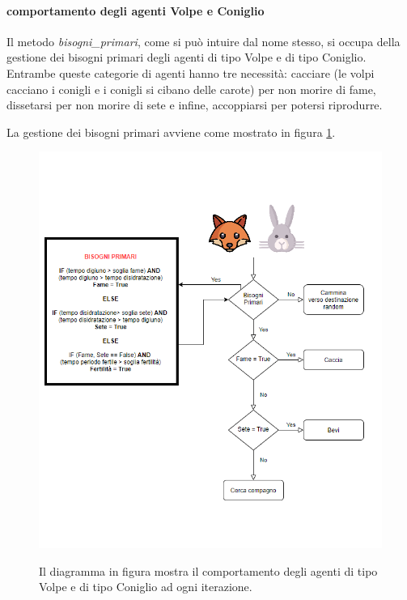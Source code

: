 \documentclass[11pt]{article}
\begin{document}
\paragraph{comportamento degli agenti Volpe e Coniglio}

Il metodo \emph{bisogni\_primari}, come si può intuire dal nome stesso, si occupa della gestione dei bisogni primari degli agenti di tipo Volpe e di tipo Coniglio. Entrambe queste categorie di agenti hanno tre necessità: cacciare (le volpi cacciano i conigli e i conigli si cibano delle carote) per non morire di fame, dissetarsi per non morire di sete e infine, accoppiarsi per potersi riprodurre. 

La gestione dei bisogni primari avviene come mostrato in figura \ref{fig:diagrammaComportamentale}. 
\begin{figure}
     \centering
     \includegraphics[scale = 0.7]{diagramma_comportamentale.png}
     \label{fig:diagrammaComportamentale}
     \caption{Il diagramma in figura mostra il comportamento degli agenti di tipo Volpe e di tipo Coniglio ad ogni iterazione.}
\end{figure}
\end{document}
